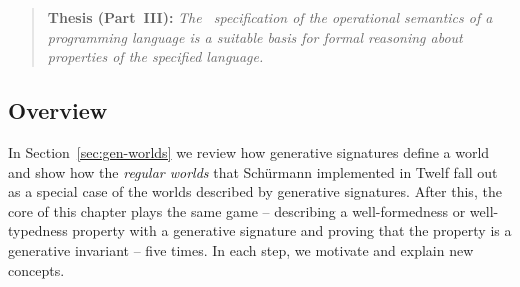 \smallskip
\begin{quote} 
  {\bf Thesis (Part~III):} {\it The \sls~specification of the operational
    semantics of a programming language is a suitable basis for formal
    reasoning about properties of the specified language.}
\end{quote} 


\subsection*{Overview}

In Section~\ref{sec:gen-worlds} we review how generative signatures
define a world and show how the {\it regular worlds} that Sch\"urmann
implemented in Twelf \cite{schurmann00automating} fall out as a
special case of the worlds described by generative signatures.  After
this, the core of this chapter plays the same game -- describing a
well-formedness or well-typedness property with a generative signature
and proving that the property is a generative invariant -- five times.
In each step, we motivate and explain new concepts.

